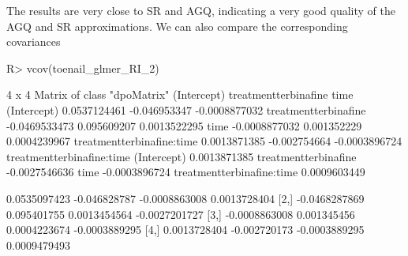 \documentclass[article,nojss,shortnames]{jss}\usepackage[]{graphicx}\usepackage[]{xcolor}
\begin{document}
The results are very close to SR and AGQ, indicating a very good quality of
the AGQ and SR approximations. We can also compare the corresponding covariances
\begin{Schunk}
\begin{Sinput}
R> vcov(toenail_glmer_RI_2)
\end{Sinput}
\begin{Soutput}
4 x 4 Matrix of class "dpoMatrix"
                            (Intercept) treatmentterbinafine          time
(Intercept)                0.0537124461         -0.046953347 -0.0008877032
treatmentterbinafine      -0.0469533473          0.095609207  0.0013522295
time                      -0.0008877032          0.001352229  0.0004239967
treatmentterbinafine:time  0.0013871385         -0.002754664 -0.0003896724
                          treatmentterbinafine:time
(Intercept)                            0.0013871385
treatmentterbinafine                  -0.0027546636
time                                  -0.0003896724
treatmentterbinafine:time              0.0009603449
\end{Soutput}
\begin{Soutput}
              [,1]         [,2]          [,3]          [,4]
[1,]  0.0535097423 -0.046828787 -0.0008863008  0.0013728404
[2,] -0.0468287869  0.095401755  0.0013454564 -0.0027201727
[3,] -0.0008863008  0.001345456  0.0004223674 -0.0003889295
[4,]  0.0013728404 -0.002720173 -0.0003889295  0.0009479493
\end{Soutput}
\end{Schunk}
\end{document}
